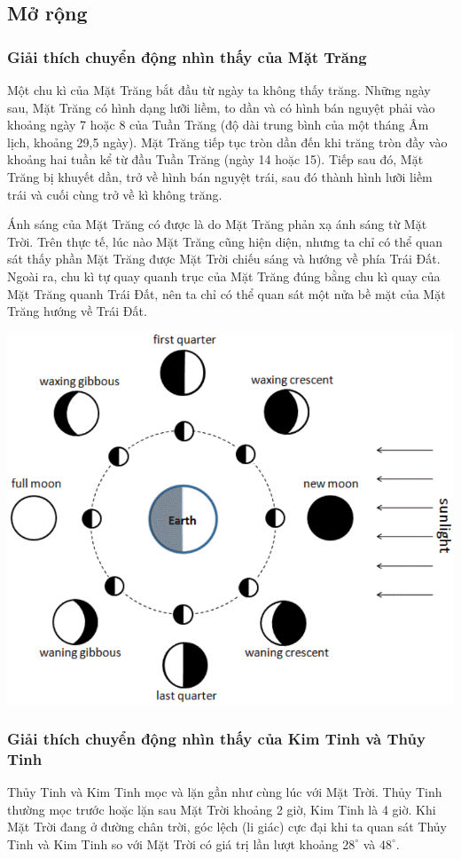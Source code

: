 \subsection{Mở rộng}
\subsubsection{Giải thích chuyển động nhìn thấy của Mặt Trăng}
Một chu kì của Mặt Trăng bắt đầu từ ngày ta không thấy trăng. Những ngày sau, Mặt Trăng có hình dạng lưỡi liềm, to dần và có hình bán nguyệt phải vào khoảng ngày 7 hoặc 8 của Tuần Trăng (độ dài trung bình của một tháng Âm lịch, khoảng 29,5 ngày). Mặt Trăng tiếp tục tròn dần đến khi trăng tròn đầy vào khoảng hai tuần kể từ đầu Tuần Trăng (ngày 14 hoặc 15). Tiếp sau đó, Mặt Trăng bị khuyết dần, trở về hình bán nguyệt trái, sau đó thành hình lưỡi liềm trái và cuối cùng trở về kì không trăng.

Ánh sáng của Mặt Trăng có được là do Mặt Trăng phản xạ ánh sáng từ Mặt Trời. Trên thực tế, lúc nào Mặt Trăng cũng hiện diện, nhưng ta chỉ có thể quan sát thấy phần Mặt Trăng được Mặt Trời chiếu sáng và hướng về phía Trái Đất. Ngoài ra, chu kì tự quay quanh trục của Mặt Trăng đúng bằng chu kì quay của Mặt Trăng quanh Trái Đất, nên ta chỉ có thể quan sát một nửa bề mặt của Mặt Trăng hướng về Trái Đất.

\begin{center}
	\includegraphics[scale=0.5]{../figs/G10-034-5}
\end{center}
\subsubsection{Giải thích chuyển động nhìn thấy của Kim Tinh và Thủy Tinh}
Thủy Tinh và Kim Tinh mọc và lặn gần như cùng lúc với Mặt Trời. Thủy Tinh thường mọc trước hoặc lặn sau Mặt Trời khoảng 2 giờ, Kim Tinh là 4 giờ. Khi Mặt Trời đang ở đường chân trời, góc lệch (li giác) cực đại khi ta quan sát Thủy Tinh và Kim Tinh so với Mặt Trời có giá trị lần lượt khoảng $28^\circ$ và $48^\circ$.

